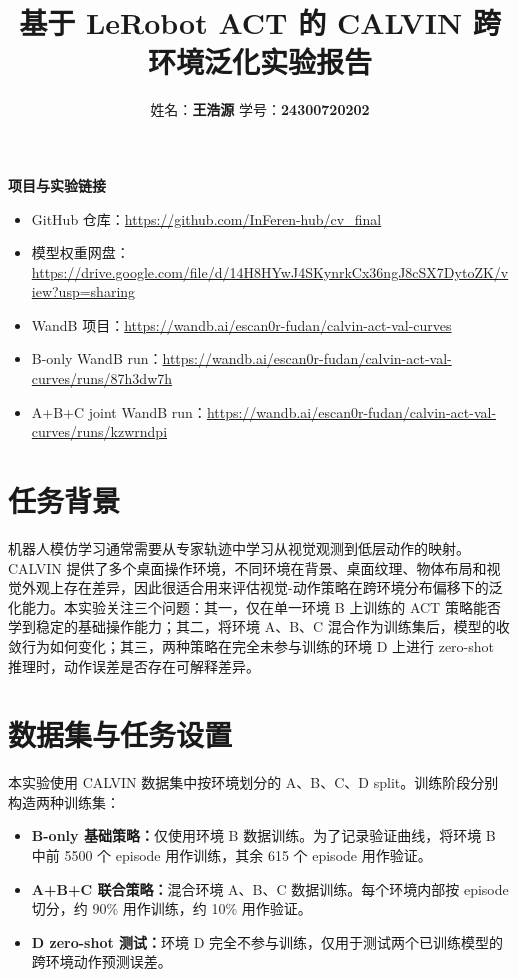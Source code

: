 \documentclass[10pt,a4paper]{ctexart}
\title{\textbf{基于 LeRobot ACT 的 CALVIN 跨环境泛化实验报告}}
\author{姓名：\textbf{王浩源} \quad 学号：\textbf{24300720202}}
\date{}
\begin{document}
\maketitle

\noindent\textbf{项目与实验链接}
\begin{itemize}[leftmargin=1.2em,itemsep=0.25em]
  \item GitHub 仓库：\url{https://github.com/InFeren-hub/cv_final}
  \item 模型权重网盘：\url{https://drive.google.com/file/d/14H8HYwJ4SKynrkCx36ngJ8cSX7DytoZK/view?usp=sharing}
  \item WandB 项目：\url{https://wandb.ai/escan0r-fudan/calvin-act-val-curves}
  \item B-only WandB run：\url{https://wandb.ai/escan0r-fudan/calvin-act-val-curves/runs/87h3dw7h}
  \item A+B+C joint WandB run：\url{https://wandb.ai/escan0r-fudan/calvin-act-val-curves/runs/kzwrndpi}
\end{itemize}

\section{任务背景}
机器人模仿学习通常需要从专家轨迹中学习从视觉观测到低层动作的映射。CALVIN 提供了多个桌面操作环境，不同环境在背景、桌面纹理、物体布局和视觉外观上存在差异，因此很适合用来评估视觉-动作策略在跨环境分布偏移下的泛化能力。本实验关注三个问题：其一，仅在单一环境 B 上训练的 ACT 策略能否学到稳定的基础操作能力；其二，将环境 A、B、C 混合作为训练集后，模型的收敛行为如何变化；其三，两种策略在完全未参与训练的环境 D 上进行 zero-shot 推理时，动作误差是否存在可解释差异。

\section{数据集与任务设置}
本实验使用 CALVIN 数据集中按环境划分的 A、B、C、D split。训练阶段分别构造两种训练集：
\begin{itemize}[leftmargin=1.2em,itemsep=0.25em]
  \item \textbf{B-only 基础策略：}仅使用环境 B 数据训练。为了记录验证曲线，将环境 B 中前 5500 个 episode 用作训练，其余 615 个 episode 用作验证。
  \item \textbf{A+B+C 联合策略：}混合环境 A、B、C 数据训练。每个环境内部按 episode 切分，约 90\% 用作训练，约 10\% 用作验证。
  \item \textbf{D zero-shot 测试：}环境 D 完全不参与训练，仅用于测试两个已训练模型的跨环境动作预测误差。
\end{itemize}
\end{document}
